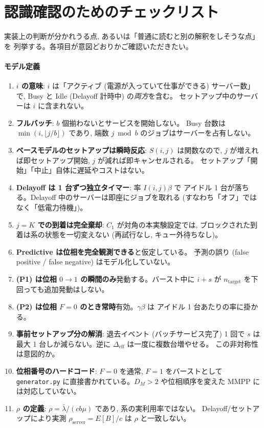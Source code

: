 \documentclass[a4paper,11pt]{article}
\newcommand{\code}[1]{\texttt{#1}}
\newcommand{\eff}{\mathrm{eff}}
\begin{document}
\section{認識確認のためのチェックリスト}
\label{sec:checklist}

実装上の判断が分かれうる点, あるいは「普通に読むと別の解釈をしそうな点」を
列挙する。各項目が意図どおりかご確認いただきたい。

\paragraph{モデル定義}
\begin{enumerate}
\item \textbf{$i$ の意味}: $i$ は「アクティブ (電源が入っていて仕事ができる) サーバー数」で,
      Busy と Idle (Delayoff 計時中) の\emph{両方}を含む。
      セットアップ中のサーバーは $i$ に含まれない。
\item \textbf{フルバッチ}: $b$ 個揃わないとサービスを開始しない。
      Busy 台数は $\min(i,\lfloor j/b\rfloor)$ であり,
      端数 $j \bmod b$ のジョブはサーバーを占有しない。
\item \textbf{ベースモデルのセットアップは瞬時反応}: $S(i,j)$ は関数なので,
      $j$ が増えれば即セットアップ開始, $j$ が減れば即キャンセルされる。
      セットアップ「開始」「中止」自体に遅延やコストはない。
\item \textbf{Delayoff は 1 台ずつ独立タイマー}: 率 $I(i,j)\beta$ で
      アイドル 1 台が落ちる。Delayoff 中のサーバーは即座にジョブを取れる
      (すなわち「オフ」ではなく「低電力待機」)。
\item \textbf{$j=K$ での到着は完全棄却}: $C_1$ が対角の本実験設定では,
      ブロックされた到着は系の状態を一切変えない (再試行なし, キュー外待ちなし)。
\item \textbf{Predictive は位相を完全観測できる}と仮定している。
      予測の誤り (false positive / false negative) はモデル化していない。
\item \textbf{(P1) は位相 $0\to1$ の瞬間のみ}発動する。バースト中に
      $i+s$ が $n_{\mathrm{target}}$ を下回っても追加発動はしない。
\item \textbf{(P2) は位相 $F=0$ のとき常時}有効。$\gamma\beta$ は
      アイドル 1 台あたりの率に掛かる。
\item \textbf{事前セットアップ分の解消}: 退去イベント (バッチサービス完了) 1 回で
      $s$ は最大 1 台しか減らない。逆に $\Delta_{\eff}$ は一度に複数台増やせる。
      この非対称性は意図的か。
\item \textbf{位相番号のハードコード}: $F=0$ を通常, $F=1$ をバーストとして
      \code{generator.py} に直接書かれている。$D_M>2$ や位相順序を変えた
      MMPP には対応していない。
\item \textbf{$\rho$ の定義}: $\rho=\bar\lambda/(cb\mu)$ であり, 系の実利用率ではない。
      Delayoff/セットアップにより実測 $\rho_{\mathrm{server}}=E[B]/c$ は $\rho$ と一致しない。
\end{enumerate}
\end{document}
